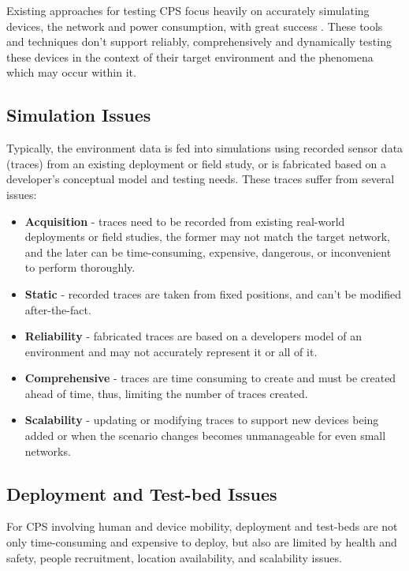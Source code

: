Existing approaches for testing CPS focus heavily on accurately simulating devices, the network and power consumption, with great success \cite{cooja, tossim}. These tools and techniques don't support reliably, comprehensively and dynamically testing these devices in the context of their target environment and the phenomena which may occur within it. 

\subsection{Simulation Issues} %
\label{ssub:simulation_issues}

Typically, the environment data is fed into simulations using recorded sensor data (traces) from an existing deployment or field study\cite{bridge,Gaglione2018}, or is fabricated based on a developer's conceptual model and testing needs. These traces suffer from several issues:
\begin{itemize}
  \item \textbf{Acquisition} - traces need to be recorded from existing real-world deployments or field studies, the former may not match the target network, and the later can be time-consuming, expensive, dangerous, or inconvenient to perform thoroughly.
  \item \textbf{Static} - recorded traces are taken from fixed positions, and can't be modified after-the-fact.
  \item \textbf{Reliability} - fabricated traces are based on a developers model of an environment and may not accurately represent it or all of it.
  \item \textbf{Comprehensive} - traces are time consuming to create and must be created ahead of time, thus, limiting the number of traces created.
  \item \textbf{Scalability} - updating or modifying traces to support new devices being added or when the scenario changes becomes unmanageable for even small networks.
\end{itemize}

\subsection{Deployment and Test-bed Issues} %
\label{ssub:deployment_and_test_bed_issues}

For CPS involving human and device mobility, deployment and test-beds\cite{wisebed1,wisebed2,TempLab,dependibilityTestbedChallenge} are not only time-consuming and expensive to deploy, but also are limited by health and safety, people recruitment, location availability, and scalability issues.

